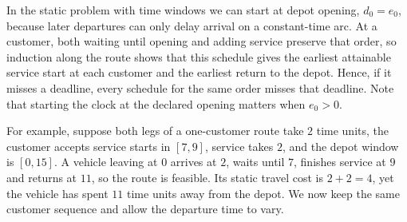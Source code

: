 In the static problem with time windows we can start at depot opening, $d_0=e_0$, because later departures can only delay arrival on a constant-time arc. At a customer, both waiting until opening and adding service preserve that order, so induction along the route shows that this schedule gives the earliest attainable service start at each customer and the earliest return to the depot. Hence, if it misses a deadline, every schedule for the same order misses that deadline. Note that starting the clock at the declared opening matters when $e_0>0$.

For example, suppose both legs of a one-customer route take $2$ time units, the customer accepts service starts in $[7,9]$, service takes $2$, and the depot window is $[0,15]$. A vehicle leaving at $0$ arrives at $2$, waits until $7$, finishes service at $9$ and returns at $11$, so the route is feasible. Its static travel cost is $2+2=4$, yet the vehicle has spent $11$ time units away from the depot. We now keep the same customer sequence and allow the departure time to vary.
